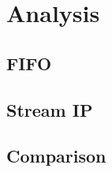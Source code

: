 
\chapter{Analysis}
\label{cha:Analysis}


\section{FIFO}
\label{sec:FIFO}


\section{Stream IP}
\label{sec:Stream IP}

\section{Comparison}
\label{sec:Comparison}






